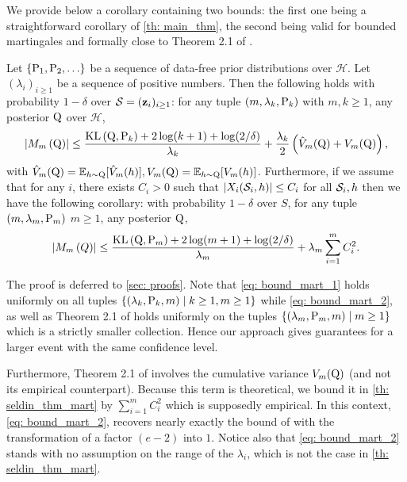 \begin{noaddcontents}
We provide below a corollary containing two bounds: the first one being a straightforward corollary of \cref{th: main_thm}, the second being valid for bounded martingales and formally close to Theorem 2.1 of \citet{seldin2012bandit}.
\begin{corollary}
\label{cor: bound_mart}
Let $\left\{\P_1, \P_2, \ldots\right\}$ be a sequence of data-free prior distributions over $\mathcal{H}$. Let $(\lambda_i)_{i\geq 1}$ be a sequence of positive numbers.
Then the following holds with probability $1-\delta$ over $\S=(\z_i)_{i\geq 1}$: for any tuple $(m,\lambda_k,\P_k)$ with $m,k\geq 1$, any posterior $\Q$ over $\mathcal{H}$,
\begin{align}
\label{eq: bound_mart_1}
\left|M_m\left(\Q\right)\right| \leq \frac{\KL\left(\Q, \P_k\right)+2 \log (k+1)+\log (2/\delta)}{\lambda_k}+ \frac{\lambda_k}{2}\left( \hat{V}_m(\Q) + V_m(\Q) \right),
\end{align}
with $\hat{V}_m(\Q)= \mathbb{E}_{h\sim \Q}[\hat{V}_m(h)], V_m(\Q)= \mathbb{E}_{h\sim \Q}[V_m(h)]$.
Furthermore, if we assume that for any $i$, there exists $C_i>0$ such that $|X_i(\S_i,h)|\leq C_i$ for all $\S_i,h$ then we have the following corollary: with probability $1-\delta$ over $S$, for any tuple $(m,\lambda_m,\P_m)$ $m\geq 1$, any posterior $\Q$,
\begin{align}
\label{eq: bound_mart_2}
\left|M_m\left(Q\right)\right| \leq \frac{\KL\left(\Q, \P_m\right)+2 \log (m+1)+\log (2/\delta)}{\lambda_m}+ \lambda_m\sum_{i=1}^m C_i^2.
\end{align}
\end{corollary}
The proof is deferred to \cref{sec: proofs}.
Note that \cref{eq: bound_mart_1} holds uniformly on all tuples $\{(\lambda_k,\P_k,m) \mid k\geq 1, m\geq 1\}$ while \cref{eq: bound_mart_2}, as well as Theorem 2.1 of \citet{seldin2012bandit} holds uniformly on the tuples
$\{(\lambda_m,\P_m,m) \mid m\geq 1\}$ which is a strictly smaller collection. Hence our approach gives guarantees for a larger event with the same confidence level.

Furthermore, Theorem 2.1 of \citet{seldin2012bandit} involves the cumulative variance $V_m(\Q)$ (and not its empirical counterpart). Because this term is theoretical, we bound it in \cref{th: seldin_thm_mart} by $\sum_{i=1}^m C_i^2$ which is supposedly empirical.
In this context, \cref{eq: bound_mart_2}, recovers nearly exactly the bound of \cite{seldin2012bandit} with the transformation of a factor $(e-2)$ into $1$.
Notice also that \cref{eq: bound_mart_2} stands with no assumption on the range of the $\lambda_i$, which is not the case in \cref{th: seldin_thm_mart}.


\end{noaddcontents}
